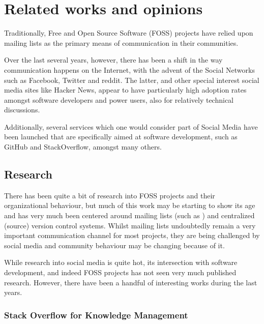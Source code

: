 \documentclass[a4paper,11pt]{article} %
\begin{document}
\section{Related works and opinions}

Traditionally, Free and Open Source Software (FOSS) projects have
relied upon mailing lists as the primary means of communication in
their communities. %

Over the last several years, however, there has been a shift in the way
communication happens on the Internet, with the advent of the Social
Networks such as Facebook, Twitter and reddit. The latter, and other special
interest social media sites like Hacker News, appear to have particularly
high adoption rates amongst software developers and power users, also for
relatively technical discussions.

Additionally, several services which one would consider part of Social Media
have been launched that are specifically aimed at software development, such
as GitHub and StackOverflow, amongst many others.

\subsection{Research}
There has been quite a bit of research into FOSS projects and their
organizational behaviour, but much of this work may be starting to show its
age and has very much been centered around mailing lists (such as
\cite{Oezbek10Cancer, singh2011network}) and centralized (source) version
control systems. Whilst mailing lists undoubtedly remain a very important
communication channel for most projects, they are being challenged by social
media and community behaviour may be changing because of it.

While research into social media is quite hot, its intersection with
software development, and indeed FOSS projects has not seen very much
published research. However, there have been a handful of interesting works
during the last years.

\subsubsection{Stack Overflow for Knowledge Management}
\end{document}
